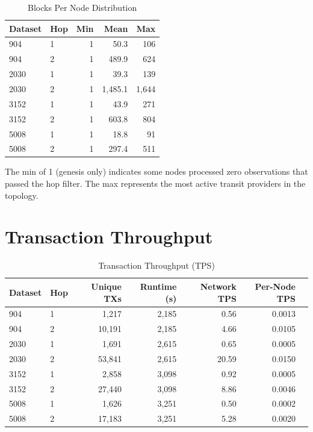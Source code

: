 \documentclass[11pt,a4paper]{article}
\begin{document}
\begin{table}[H]
\centering
\caption{Blocks Per Node Distribution}
\begin{tabular}{llrrr}
\toprule
\textbf{Dataset} & \textbf{Hop} & \textbf{Min} & \textbf{Mean} & \textbf{Max} \\
\midrule
904   & 1 & 1    & 50.3   & 106 \\
904   & 2 & 1    & 489.9  & 624 \\
2030  & 1 & 1    & 39.3   & 139 \\
2030  & 2 & 1    & 1,485.1 & 1,644 \\
3152  & 1 & 1    & 43.9   & 271 \\
3152  & 2 & 1    & 603.8  & 804 \\
5008  & 1 & 1    & 18.8   & 91 \\
5008  & 2 & 1    & 297.4  & 511 \\
\bottomrule
\end{tabular}
\end{table}

The min of 1 (genesis only) indicates some nodes processed zero observations
that passed the hop filter. The max represents the most active transit providers
in the topology.

\section{Transaction Throughput}

\begin{table}[H]
\centering
\caption{Transaction Throughput (TPS)}
\begin{tabular}{llrrrrr}
\toprule
\textbf{Dataset} & \textbf{Hop} & \textbf{Unique TXs} & \textbf{Runtime (s)} & \textbf{Network TPS} & \textbf{Per-Node TPS} \\
\midrule
904   & 1 & 1,217   & 2,185 & 0.56  & 0.0013 \\
904   & 2 & 10,191  & 2,185 & 4.66  & 0.0105 \\
2030  & 1 & 1,691   & 2,615 & 0.65  & 0.0005 \\
2030  & 2 & 53,841  & 2,615 & 20.59 & 0.0150 \\
3152  & 1 & 2,858   & 3,098 & 0.92  & 0.0005 \\
3152  & 2 & 27,440  & 3,098 & 8.86  & 0.0046 \\
5008  & 1 & 1,626   & 3,251 & 0.50  & 0.0002 \\
5008  & 2 & 17,183  & 3,251 & 5.28  & 0.0020 \\
\bottomrule
\end{tabular}
\end{table}
\end{document}
